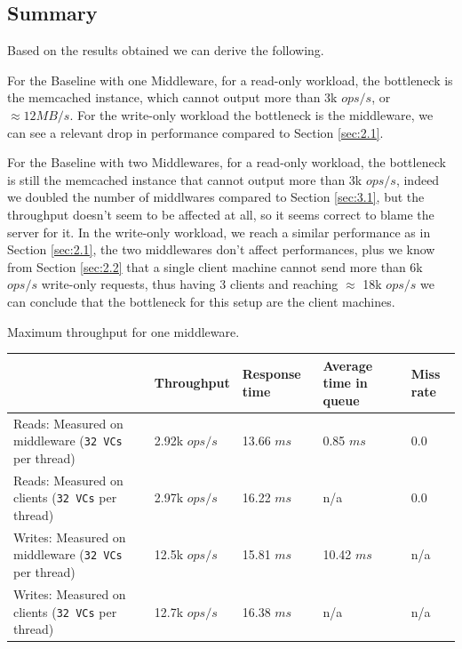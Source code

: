 \documentclass[11pt,a4paper]{article}
\begin{document}
\subsection{Summary}

Based on the results obtained we can derive the following.

For the Baseline with one Middleware, for a read-only workload, the bottleneck is the memcached instance, which cannot output more than 3k $ops/s$, or $\approx 12 MB/s$.
For the write-only workload the bottleneck is the middleware, we can see a relevant drop in performance compared to Section \ref{sec:2.1}.

For the Baseline with two Middlewares, for a read-only workload, the bottleneck is still the memcached instance that cannot output more than 3k $ops/s$, indeed we doubled the number of middlwares compared to Section \ref{sec:3.1}, but the throughput doesn't seem to be affected at all, so it seems correct to blame the server for it.
In the write-only workload, we reach a similar performance as in Section \ref{sec:2.1}, the two middlewares don't affect performances, plus we know from Section \ref{sec:2.2} that a single client machine cannot send more than 6k $ops/s$ write-only requests, thus having 3 clients and reaching $\approx$ 18k $ops/s$ we can conclude that the bottleneck for this setup are the client machines.

\begin{center}
	{Maximum throughput for one middleware.}
    \scriptsize{
	\begin{tabular}{|l|p{2cm}|p{2cm}|p{2cm}|p{2cm}|}
		\hline                                & Throughput & Response time & Average time in queue & Miss rate \\ 
        \hline Reads: Measured on middleware (\texttt{32 VCs} per thread) & 2.92k $ops/s$ & 13.66 $ms$ & 0.85 $ms$ & 0.0 \\ 
        \hline Reads: Measured on clients (\texttt{32 VCs} per thread)    & 2.97k $ops/s$ & 16.22 $ms$ & n/a  & 0.0 \\ 
        \hline Writes: Measured on middleware (\texttt{32 VCs} per thread) & 12.5k $ops/s$ & 15.81 $ms$ & 10.42 $ms$ & n/a       \\ 
        \hline Writes: Measured on clients (\texttt{32 VCs} per thread)    & 12.7k $ops/s$ & 16.38 $ms$ & n/a & n/a       \\ 
		\hline 
	\end{tabular}
    }
\end{center}
\end{document}
